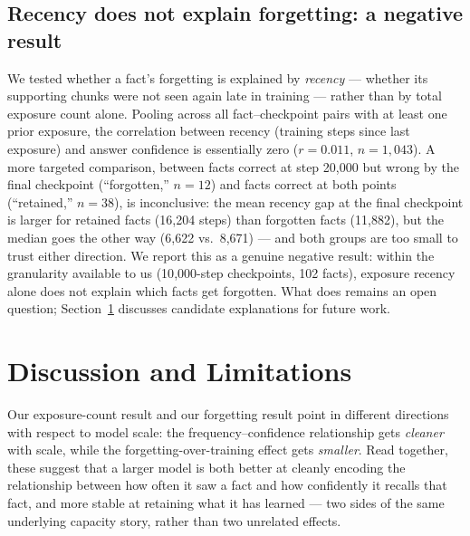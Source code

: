 \documentclass[11pt]{article}
\begin{document}
\subsection{Recency does not explain forgetting: a negative result}
We tested whether a fact's forgetting is explained by \emph{recency} --- whether its supporting chunks were not seen again late in training --- rather than by total exposure count alone. Pooling across all fact--checkpoint pairs with at least one prior exposure, the correlation between recency (training steps since last exposure) and answer confidence is essentially zero ($r=0.011$, $n=1{,}043$). A more targeted comparison, between facts correct at step 20{,}000 but wrong by the final checkpoint (``forgotten,'' $n=12$) and facts correct at both points (``retained,'' $n=38$), is inconclusive: the mean recency gap at the final checkpoint is larger for retained facts (16{,}204 steps) than forgotten facts (11{,}882), but the median goes the other way (6{,}622 vs.\ 8{,}671) --- and both groups are too small to trust either direction. We report this as a genuine negative result: within the granularity available to us (10{,}000-step checkpoints, 102 facts), exposure recency alone does not explain which facts get forgotten. What does remains an open question; Section~\ref{sec:discussion} discusses candidate explanations for future work.

\section{Discussion and Limitations}
\label{sec:discussion}

Our exposure-count result and our forgetting result point in different directions with respect to model scale: the frequency--confidence relationship gets \emph{cleaner} with scale, while the forgetting-over-training effect gets \emph{smaller}. Read together, these suggest that a larger model is both better at cleanly encoding the relationship between how often it saw a fact and how confidently it recalls that fact, and more stable at retaining what it has learned --- two sides of the same underlying capacity story, rather than two unrelated effects.
\end{document}
